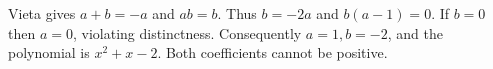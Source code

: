 Vieta gives $a+b=-a$ and $ab=b$. Thus $b=-2a$ and $b(a-1)=0$. If $b=0$ then $a=0$, violating distinctness. Consequently $a=1,b=-2$, and the polynomial is $\boxed{x^2+x-2}$. Both coefficients cannot be positive.
